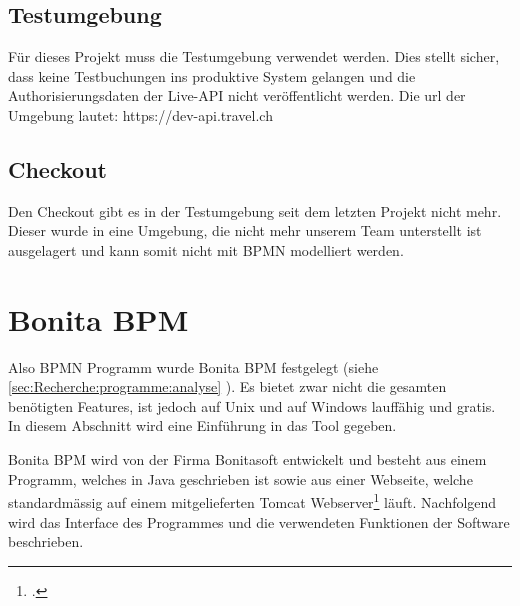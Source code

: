\subsection{Testumgebung}
Für dieses Projekt muss die Testumgebung verwendet werden. Dies stellt sicher, dass keine Testbuchungen ins produktive System gelangen und die Authorisierungsdaten der Live-API nicht veröffentlicht werden.
Die \gls{url} der Umgebung lautet: https://dev-api.travel.ch

\subsection{Checkout}
Den Checkout gibt es in der Testumgebung seit dem letzten Projekt nicht mehr. Dieser wurde in eine Umgebung, die nicht mehr unserem Team unterstellt ist ausgelagert und kann somit nicht mit BPMN modelliert werden.

\section{Bonita BPM}
Also BPMN Programm wurde Bonita BPM festgelegt (siehe \cref{sec:Recherche:programme:analyse} ). Es bietet zwar nicht die gesamten benötigten Features, ist jedoch auf Unix und auf Windows lauffähig und gratis. In diesem Abschnitt wird eine Einführung in das Tool gegeben. 

Bonita BPM wird von der Firma Bonitasoft entwickelt und besteht aus einem Programm, welches in Java geschrieben ist sowie aus einer Webseite, welche standardmässig auf einem mitgelieferten Tomcat Webserver\footcite{Tomcat_2016-06-12} läuft.
Nachfolgend wird das Interface des Programmes und die verwendeten Funktionen der Software beschrieben.


